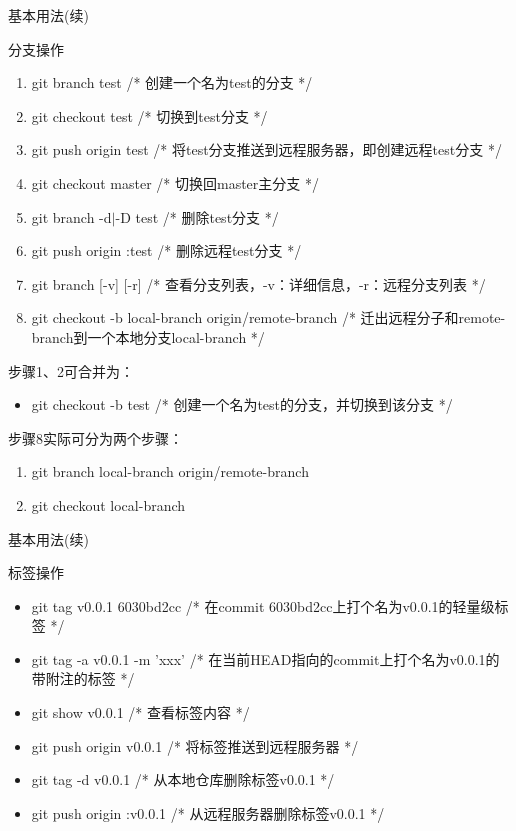 \documentclass[CJK, 10pt]{beamer}
\begin{document}
\begin{CJK*}{UTF8}{gbsn}
\begin{frame}{基本用法(续)}
\begin{block}{分支操作}
\begin{enumerate}
            \item git branch test /* 创建一个名为test的分支 */
            \item git checkout test /* 切换到test分支 */
            \item git push origin test /* 将test分支推送到远程服务器，即创建远程test分支 */
            \item git checkout master /* 切换回master主分支 */
            \item git branch -d$|$-D test /* 删除test分支 */
            \item git push origin :test /* 删除远程test分支 */
            \item git branch [-v] [-r] /* 查看分支列表，-v：详细信息，-r：远程分支列表 */
            \item git checkout -b local-branch origin/remote-branch /* 迁出远程分子和remote-branch到一个本地分支local-branch */
        \end{enumerate}
        步骤1、2可合并为：
        \begin{itemize}
            \item git checkout -b test /* 创建一个名为test的分支，并切换到该分支 */
        \end{itemize}
        步骤8实际可分为两个步骤：
        \begin{enumerate}
            \item git branch local-branch origin/remote-branch
            \item git checkout local-branch
        \end{enumerate}
    \end{block}
\end{frame}
\begin{frame}{基本用法(续)}
    \begin{block}{标签操作}
        \begin{itemize}
            \item git tag v0.0.1 6030bd2cc /* 在commit 6030bd2cc上打个名为v0.0.1的轻量级标签 */
            \item git tag -a v0.0.1 -m 'xxx' /* 在当前HEAD指向的commit上打个名为v0.0.1的带附注的标签 */
            \item git show v0.0.1 /* 查看标签内容 */
            \item git push origin v0.0.1 /* 将标签推送到远程服务器 */
            \item git tag -d v0.0.1 /* 从本地仓库删除标签v0.0.1 */
            \item git push origin :v0.0.1 /* 从远程服务器删除标签v0.0.1 */

\end{itemize}
\end{block}
\end{frame}
\end{CJK*}
\end{document}
